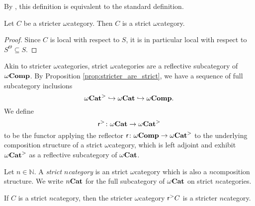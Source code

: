 \begin{rmk}
    By \cite[Theorem 1.12]{berger2002cellular}, this definition is equivalent to the standard definition.
\end{rmk}

\begin{prop} \label{prop:stricter_are_strict}
    Let \( C \) be a stricter \( \omega \)\nbd category.
    Then \( C \) is a strict \( \omega \)\nbd category.
\end{prop}
\begin{proof}
    Since \( C \) is local with respect to \( S \), it is in particular local with respect to \( S^\Theta \subseteq S \).
\end{proof} 

\noindent Akin to stricter \( \omega \)\nbd categories, strict \( \omega \)\nbd categories are a reflective subcategory of \( \omega\mathbf{Comp} \).
By Proposition \ref{prop:stricter_are_strict}, we have a sequence of full subcategory inclusions
\begin{equation*}
     {\omega\mathbf{Cat}}^> \hookrightarrow {\omega\mathbf{Cat}} \hookrightarrow \omega\mathbf{Comp}.
\end{equation*}
We define
\begin{equation*}
    \mathsf{r}^{>} \colon {\omega\mathbf{Cat}} \to {\omega\mathbf{Cat}}^>
\end{equation*}
to be the functor applying the reflector \( \mathsf{r} \colon \omega\mathbf{Comp} \to {\omega\mathbf{Cat}}^>  \) to the underlying composition structure of a strict \( \omega \)\nbd category, which is left adjoint and exhibit \( {\omega\mathbf{Cat}}^> \) as a reflective subcategory of \( {\omega\mathbf{Cat}} \).

\begin{dfn} 
    Let \( n \in \mathbb{N} \).
    A \emph{strict \( n \)\nbd category} is an strict \( \omega \)\nbd category which is also a \( n \)\nbd composition structure.
    We write \( {n\mathbf{Cat}} \) for the full subcategory of \( {\omega\mathbf{Cat}} \) on strict \( n \)\nbd categories.
\end{dfn}

\begin{rmk}
    If \( C \) is a strict \( n \)\nbd category, then the stricter \( \omega \)\nbd category \( \mathsf{r}^{>} C \) is a stricter \( n \)\nbd category.
\end{rmk}

